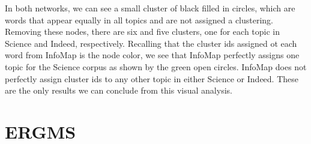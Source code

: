 \documentclass[12pt]{article}
\begin{document}
\vspace{2mm}
\noindent In both networks, we can see a small cluster of black filled in circles, which are words that appear equally in all topics and are not assigned a clustering. Removing these nodes, there are six and five clusters, one for each topic in Science and Indeed, respectively. Recalling that the cluster ids assigned ot each word from InfoMap is the node color, we see that InfoMap perfectly assigns one topic for the Science corpus as shown by the green open circles. InfoMap does not perfectly assign cluster ids to any other topic in either Science or Indeed. These are the only results we can conclude from this visual analysis.

\section{ERGMS}
\end{document}
